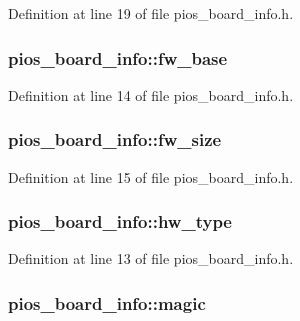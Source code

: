Definition at line 19 of file pios\-\_\-board\-\_\-info.\-h.

\hypertarget{structpios__board__info_ab478e3140ec858f6347f061cf10d8cf5}{
\subsubsection[{fw\-\_\-base}]{ pios\-\_\-board\-\_\-info\-::fw\-\_\-base}}\label{structpios__board__info_ab478e3140ec858f6347f061cf10d8cf5}


Definition at line 14 of file pios\-\_\-board\-\_\-info.\-h.

\hypertarget{structpios__board__info_a0b8e1fae0f06a06384829d6f2dfe5f20}{
\subsubsection[{fw\-\_\-size}]{ pios\-\_\-board\-\_\-info\-::fw\-\_\-size}}\label{structpios__board__info_a0b8e1fae0f06a06384829d6f2dfe5f20}


Definition at line 15 of file pios\-\_\-board\-\_\-info.\-h.

\hypertarget{structpios__board__info_a3a94af2d49603c2cbef32e8b56e5c057}{
\subsubsection[{hw\-\_\-type}]{ pios\-\_\-board\-\_\-info\-::hw\-\_\-type}}\label{structpios__board__info_a3a94af2d49603c2cbef32e8b56e5c057}


Definition at line 13 of file pios\-\_\-board\-\_\-info.\-h.

\hypertarget{structpios__board__info_aab5bc5b7905e46df6cc7fd90fdb318d4}{
\subsubsection[{magic}]{ pios\-\_\-board\-\_\-info\-::magic}}\label{structpios__board__info_aab5bc5b7905e46df6cc7fd90fdb318d4}



